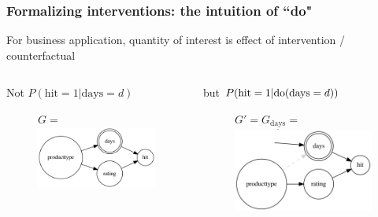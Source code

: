 \begin{frame}
\frametitle{Formalizing interventions: the intuition of ``do"}
    For business application, quantity of interest is effect of intervention / counterfactual %
\begin{columns}[T] %
    \begin{column}{.48\textwidth}
    Not $P(\textrm{hit}=1 | \textrm{days}=d)$\newline
    \begin{figure}[ht]
        $G = $ \includegraphics[height=0.55\textwidth]{graphics/given_days}
    \end{figure}
    \end{column}%
    \begin{column}{.48\textwidth}
        but $P(\textrm{hit}=1 | \mathrm{do}(\textrm{days}=d))$\newline
               \begin{figure}[ht]
             $G' = G_{\underline{\textrm{days}}} =$
             \includegraphics[height=0.55\textwidth]{graphics/do_days}
        \end{figure}
         \end{column}%
    \end{columns}
\end{frame}


